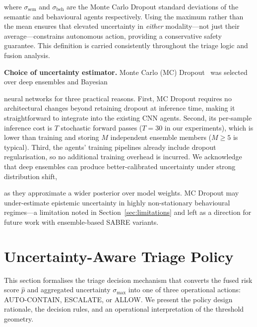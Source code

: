 \documentclass[3p]{elsarticle}
\begin{document}
\begin{changedblock}
where $\sigma_{\text{sem}}$ and $\sigma_{\text{beh}}$ are the Monte Carlo Dropout standard
deviations of the semantic and behavioural agents respectively. Using the maximum rather than
the mean ensures that elevated uncertainty in \emph{either} modality---not just their
average---constrains autonomous action, providing a conservative safety guarantee.
This definition is carried consistently throughout the triage logic and fusion analysis.
\end{changedblock}

\begin{changedblock}
\noindent\textbf{Choice of uncertainty estimator.}
Monte Carlo (MC) Dropout~\cite{gal2016dropout} was selected over deep ensembles and Bayesian
\end{changedblock}
neural networks for three practical reasons. First, MC Dropout requires no architectural
changes beyond retaining dropout at inference time, making it straightforward to integrate
into the existing CNN agents. Second, its per-sample inference cost is $T$ stochastic forward
passes ($T = 30$ in our experiments), which is lower than training and storing $M$ independent
ensemble members ($M \ge 5$ is typical). Third, the agents' training pipelines already include
dropout regularisation, so no additional training overhead is incurred. We acknowledge that
deep ensembles can produce better-calibrated uncertainty under strong distribution shift,
\begin{changedblock}
as they approximate a wider posterior over model weights. MC Dropout may under-estimate
epistemic uncertainty in highly non-stationary behavioural regimes---a limitation noted in
Section~\ref{sec:limitations} and left as a direction for future work with ensemble-based
SABRE variants.
\end{changedblock}


\section{Uncertainty-Aware Triage Policy}
\label{sec:uncert_policy}

\begin{changedblock}
This section formalises the triage decision mechanism that converts the fused risk score
$\hat{p}$ and aggregated uncertainty $\sigma_{\max}$ into one of three operational actions:
\textsc{AUTO-CONTAIN}, \textsc{ESCALATE}, or \textsc{ALLOW}. We present the policy design
rationale, the decision rules, and an operational interpretation of the threshold geometry.
\end{changedblock}
\end{document}
